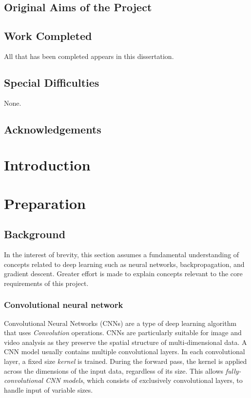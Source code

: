 \documentclass[12pt,a4paper,twoside,openright]{report}
\begin{document}
\section*{Original Aims of the Project}



\section*{Work Completed}

All that has been completed appears in this dissertation.

\section*{Special Difficulties}
None.

\newpage

\tableofcontents

\listoffigures

\newpage
\section*{Acknowledgements}


\pagestyle{headings}

\chapter{Introduction}

\chapter{Preparation}

\section{Background}
In the interest of brevity, this section assumes a fundamental understanding of concepts related to deep learning such as neural networks, backpropagation, and gradient descent. Greater effort is made to explain concepts relevant to the core requirements of this project.

\subsection{Convolutional neural network}
Convolutional Neural Networks (CNNs) are a type of deep learning algorithm that uses \textit{Convolution} operations. CNNs are particularly suitable for image and video analysis as they preserve the spatial structure of multi-dimensional data. A CNN model usually contains multiple convolutional layers. In each convolutional layer, a fixed size \textit{kernel} is trained. During the forward pass, the kernel is applied across the dimensions of the input data, regardless of its size. This allows \textit{fully-convolutional CNN models}, which consists of exclusively convolutional layers, to handle input of variable sizes.
\end{document}
